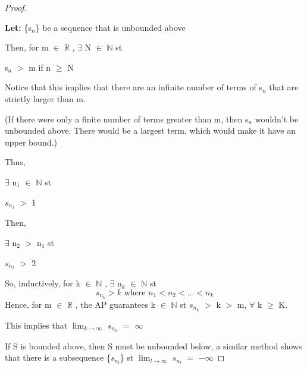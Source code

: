 \documentclass{article}
\newcommand{\mt}[1]{\ensuremath{#1}}
\newcommand{\bgpf}{\begin{proof} $ $\newline}
\newcommand{\lt}[1]{\textbf{Let: } #1}
\newcommand{\epf}{\end{proof}}
\newcommand{\dbs}[3]{\mt{#1_{#2_#3}}}
\newcommand{\br}{\mt{\mathbb{R}} }       %
\newcommand{\bn}{\mt{\mathbb{N}} }       %
\newcommand{\fa}{\mt{\forall} }          %
\newcommand{\mem}{\mt{\in} }
\newcommand{\exs}{\mt{\exists} }
\newcommand{\bk}[1]{\{#1\}}
\newcommand{\gr}{\mt{>} }
\newcommand{\gre}{\mt{\geq} }
\newcommand{\eql}{\mt{=} }
\newcommand{\uw}[2]{#1\mt{_{#2}}}
\newcommand{\lmti}[1]{\mt{\displaystyle{\lim_{#1 \to \infty}}}}
\newcommand{\eqn}[1]{\[#1\]}
\newcommand{\infy}{\mt{\infty} }
\begin{document}
{{\bgpf

\lt{\bk{\uw{s}{n}} be a sequence that is unbounded above}

Then, for m \mem \br, \exs N \mem \bn st

\uw{s}{n} \gr m if n \gre N

Notice that this implies that there are an infinite number of terms of \uw{s}{n} that are strictly larger than m.

(If there were only a finite number of terms greater than m, then \uw{s}{n} wouldn't be unbounded above. There would be a largest term, which would make it have an upper bound.)

Thus,

\exs \uw{n}{1} \mem \bn st

\dbs{s}{n}{1} \gr 1

Then,

\exs \uw{n}{2} \gr \uw{n}{1} st

\dbs{s}{n}{2} \gr 2

So, inductively, for k \mem \bn, \exs \uw{n}{k} \mem \bn st
\eqn{\dbs{s}{n}{k} \gr k \textrm{ where } n_1 < n_2 < ... < n_k}
Hence, for m \mem \br, the AP guarantees k \mem \bn st \dbs{s}{n}{k} \gr k \gr m, \fa k \gre K.

This implies that \lmti{k} \dbs{s}{n}{k} \eql \infy

If S is bounded above, then S must be unbounded below, a similar method shows that there is a subsequence \bk{\dbs{s}{n}{l}} st \lmti{l} \dbs{s}{n}{l} \eql $-\infty$

\epf

}

}
\end{document}
